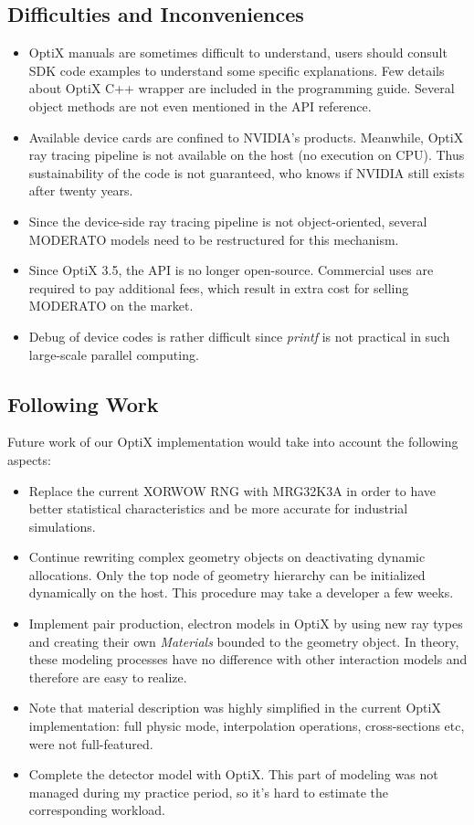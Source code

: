 \subsection{Difficulties and Inconveniences}
\begin{itemize}
  \item OptiX manuals are sometimes difficult to understand, users should consult SDK code examples to understand some specific explanations. Few details about OptiX C++ wrapper are included in the programming guide. Several object methods are not even mentioned in the API reference.
  \item Available device cards are confined to NVIDIA's products. Meanwhile, OptiX ray tracing pipeline is not available on the host (no execution on CPU). Thus sustainability of the code is not guaranteed, who knows if NVIDIA still exists after twenty years.
  \item Since the device-side ray tracing pipeline is not object-oriented, several MODERATO models need to be restructured for this mechanism.
  \item Since OptiX 3.5, the API is no longer open-source. Commercial uses are required to pay additional fees, which result in extra cost for selling MODERATO on the market.
  \item Debug of device codes is rather difficult since \textit{printf} is not practical in such large-scale parallel computing.
\end{itemize}


\subsection{Following Work}
Future work of our OptiX implementation would take into account the following aspects:
\begin{itemize}
  \item Replace the current XORWOW RNG with MRG32K3A in order to have better statistical characteristics and be more accurate for industrial simulations.
  \item Continue rewriting complex geometry objects on deactivating dynamic allocations. Only the top node of geometry hierarchy can be initialized dynamically on the host. This procedure may take a developer a few weeks.
  \item Implement pair production, electron models in OptiX by using new ray types and creating their own \textit{Materials} bounded to the geometry object. In theory, these modeling processes have no difference with other interaction models and therefore are easy to realize.
  \item Note that material description was highly simplified in the current OptiX implementation: full physic mode, interpolation operations, cross-sections etc, were not full-featured. 
  \item Complete the detector model with OptiX. This part of modeling was not managed during my practice period, so it's hard to estimate the corresponding workload.
\end{itemize}


